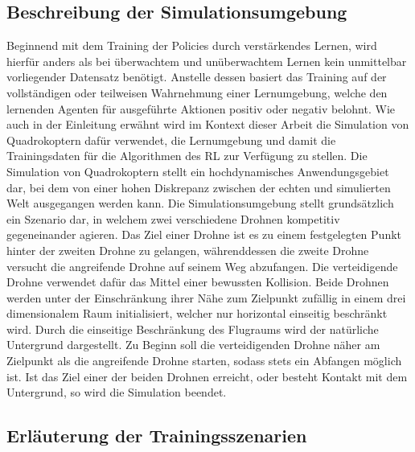 \subsection{Beschreibung der Simulationsumgebung}

Beginnend mit dem Training der Policies durch verstärkendes Lernen, wird hierfür anders als bei überwachtem und unüberwachtem Lernen kein unmittelbar vorliegender Datensatz benötigt.
Anstelle dessen basiert das Training auf der vollständigen oder teilweisen Wahrnehmung einer Lernumgebung, welche den lernenden Agenten für ausgeführte Aktionen positiv oder negativ belohnt.
Wie auch in der Einleitung erwähnt wird im Kontext dieser Arbeit die Simulation von Quadrokoptern dafür verwendet, die Lernumgebung und damit die Trainingsdaten für die Algorithmen des RL zur Verfügung zu stellen.
Die Simulation von Quadrokoptern stellt ein hochdynamisches Anwendungsgebiet dar, bei dem von einer hohen Diskrepanz zwischen der echten und simulierten Welt ausgegangen werden kann. 
Die Simulationsumgebung stellt grundsätzlich ein Szenario dar, in welchem zwei verschiedene Drohnen kompetitiv gegeneinander agieren.
Das Ziel einer Drohne ist es zu einem festgelegten Punkt hinter der zweiten Drohne zu gelangen, währenddessen die zweite Drohne versucht die angreifende Drohne auf seinem Weg abzufangen. 
Die verteidigende Drohne verwendet dafür das Mittel einer bewussten Kollision.
Beide Drohnen werden unter der Einschränkung ihrer Nähe zum Zielpunkt zufällig in einem drei dimensionalem Raum initialisiert, welcher nur horizontal einseitig beschränkt wird.
Durch die einseitige Beschränkung des Flugraums wird der natürliche Untergrund dargestellt.
Zu Beginn soll die verteidigenden Drohne näher am Zielpunkt als die angreifende Drohne starten, sodass stets ein Abfangen möglich ist.
Ist das Ziel einer der beiden Drohnen erreicht, oder besteht Kontakt mit dem Untergrund, so wird die Simulation beendet.

\subsection{Erläuterung der Trainingsszenarien}


